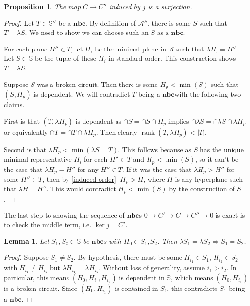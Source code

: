 \documentclass[article,twoside]{article}
\newcommand{\BB}[1]{\mathbb{#1}}
\newcommand{\script}[1]{\mathcal{#1}}
\newcommand{\rk}{\operatorname{rank}}
\newcommand{\tuples}{\BB{S}}
\newcommand{\NBC}{$\textbf{nbc}$}
\theoremstyle{plain}
\theoremstyle{plain}
\newtheorem{lemma}[lemma]{Lemma}
\theoremstyle{plain}
\newtheorem{proposition}[proposition]{Proposition}
\theoremstyle{plain}
\theoremstyle{plain}
\theoremstyle{definition}
\theoremstyle{definition}
\theoremstyle{definition}
\theoremstyle{remark}
\theoremstyle{remark}
\begin{document}
\begin{proposition}\label{broken-circuits_surjection}
	The map $C\to C''$ induced by $j$ is a surjection.
\end{proposition}
\begin{proof}
	Let $T\in\tuples''$ be a \NBC. By definition of $\script{A}''$, there is some $S$ such that $T=\lambda S$. We need to show we can choose such an $S$ as a \NBC.
	
	For each plane $H''\in T$, let $H_i$ be the minimal plane in $\script{A}$ such that $\lambda H_i=H''$. Let $S\in\tuples$ be the tuple of these $H_i$ in standard order. This construction shows $T=\lambda S$.
	
	Suppose $S$ was a broken circuit. Then there is some $H_p<\min(S)$ such that $(S,H_p)$ is dependent. We will contradict $T$ being a \NBC with the following two claims.
	
	First is that $(T,\lambda H_p)$ is dependent as $\cap S = \cap S \cap H_p$ implies $\cap\lambda S = \cap\lambda S \cap \lambda H_p$ or equivalently $\cap T = \cap T\cap\lambda H_p$. Then clearly $\rk (T,\lambda H_p)<|T|$.

	Second is that $\lambda H_p<\min(\lambda S=T)$. This follows because as $S$ has the unique minimal representative $H_i$ for each $H''\in T$ and $H_p<\min(S)$, so it can't be the case that $\lambda H_p= H''$ for any $H''\in T$. If it was the case that $\lambda H_p > H''$ for some $H''\in T$, then by \autoref{induced-order}, $H_p > H$, where $H$ is any hyperplane such that $\lambda H = H''$. This would contradict $H_p<\min(S)$ by the construction of $S$.
\end{proof}

The last step to showing the sequence of \NBC s $0\to C'\to C\to C''\to 0$ is exact is to check the middle term, i.e. $\ker j = C'$.

\begin{lemma}\label{nbc_lambda_lemma}
	Let $S_1,S_2\in\tuples$ be \NBC s with $H_0\in S_1,S_2$. Then $\lambda S_1=\lambda S_2 \Rightarrow S_1=S_2$.
\end{lemma}
\begin{proof}
	Suppose $S_1\neq S_2$. By hypothesis, there must be some $H_{i_1}\in S_1$, $H_{i_2}\in S_2$ with $H_{i_1}\neq H_{i_2}$ but $\lambda H_{i_1}= \lambda H_{i_2}$. Without loss of generality, assume $i_1>i_2$. In particular, this means $(H_0,H_{i_1},H_{i_2})$ is dependent in $\tuples$, which means $(H_0,H_{i_1})$ is a broken circuit. Since $(H_0,H_{i_1})$ is contained in $S_1$, this contradicts $S_1$ being a \NBC.
\end{proof}
\end{document}
